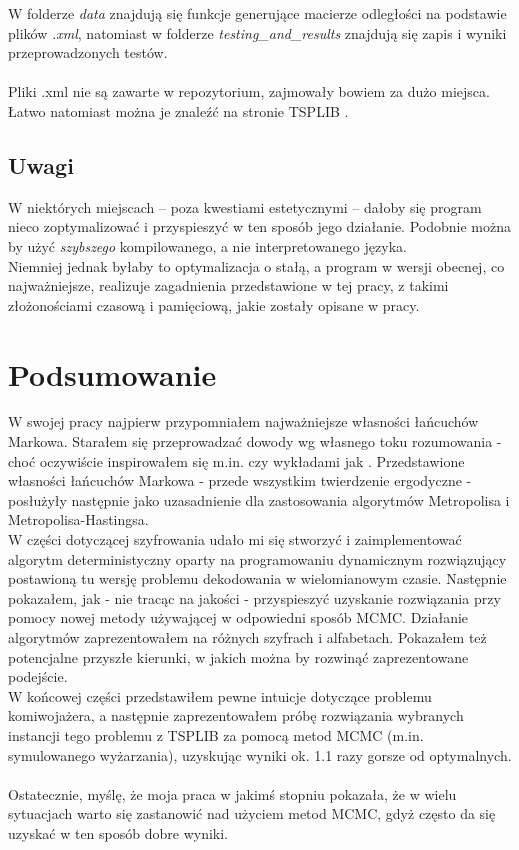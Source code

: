 \documentclass[a4paper]{article}
\theoremstyle{defn}
\theoremstyle{theorem}
\theoremstyle{lemma}
\theoremstyle{cor}
\theoremstyle{fact}
\begin{document}
W folderze \textit{data} znajdują się funkcje generujące macierze odległości na podstawie plików \textit{.xml}, natomiast w folderze \textit{testing\_and\_results} znajdują się zapis i wyniki przeprowadzonych testów. \\\\
Pliki .xml nie są zawarte w repozytorium, zajmowały bowiem za dużo miejsca. Łatwo natomiast można je znaleźć na stronie TSPLIB \cite{benchmark}.
\subsection{Uwagi}
W niektórych miejscach – poza kwestiami estetycznymi – dałoby się program nieco zoptymalizować i przyspieszyć w ten sposób jego działanie. Podobnie można by użyć \textit{szybszego} kompilowanego, a nie interpretowanego języka.\\
Niemniej jednak byłaby to optymalizacja o stałą, a program w wersji obecnej, co najważniejsze, realizuje zagadnienia przedstawione w tej pracy, z takimi złożonościami czasową i pamięciową, jakie zostały opisane w pracy.
\newpage
\section{Podsumowanie}
W swojej pracy najpierw przypomniałem najważniejsze własności łańcuchów Markowa. Starałem się przeprowadzać dowody wg własnego toku rozumowania - choć oczywiście inspirowałem się m.in. \cite{sztencel} czy wykładami jak \cite{coupling}.
Przedstawione własności łańcuchów Markowa - przede wszystkim twierdzenie ergodyczne - posłużyły następnie jako uzasadnienie dla zastosowania algorytmów Metropolisa i Metropolisa-Hastingsa.
\\
W części dotyczącej szyfrowania udało mi się stworzyć i zaimplementować algorytm deterministyczny oparty na programowaniu dynamicznym rozwiązujący postawioną tu wersję problemu dekodowania w wielomianowym czasie. Następnie pokazałem, jak - nie tracąc na jakości - przyspieszyć uzyskanie rozwiązania przy pomocy nowej metody używającej w odpowiedni sposób MCMC. Działanie algorytmów zaprezentowałem na różnych szyfrach i alfabetach. Pokazałem też potencjalne przyszłe kierunki, w jakich można by rozwinąć zaprezentowane podejście. \\
W końcowej części przedstawiłem pewne intuicje dotyczące problemu komiwojażera, a następnie zaprezentowałem próbę rozwiązania wybranych instancji tego problemu z TSPLIB za pomocą metod MCMC (m.in. symulowanego wyżarzania), uzyskując wyniki ok. 1.1 razy gorsze od optymalnych.\\\\
Ostatecznie, myślę, że moja praca w jakimś stopniu pokazała, że w wielu sytuacjach warto się zastanowić nad użyciem metod MCMC, gdyż często da się uzyskać w ten sposób dobre wyniki. 
\end{document}
